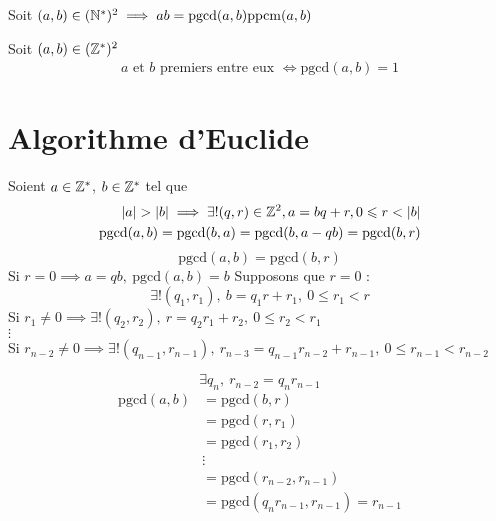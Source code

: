 \begin{graybox}
\begin{theoreme}
Soit $(a, b) \in (\mathbb{N}^*)^2 \implies ab = \mathrm{pgcd}(a, b)\mathrm{ppcm}(a, b)$
\end{theoreme}
\end{graybox}

\begin{graybox}
\begin{definition}
	Soit $(a, b) \in (\mathbb{Z}^*)^2$
	\begin{align*}
	a \text{ et } b \text{ premiers entre eux } \iff \mathrm{pgcd}(a, b) = 1
	\end{align*}
\end{definition}
\end{graybox}

\section{Algorithme d'Euclide}
\begin{graybox}
\begin{proposition}
Soient $a \in \mathbb{Z}^*$, $b \in \mathbb{Z}^*$ tel que 
\begin{align*}
|a| > |b| \implies \exists ! (q, r) \in \mathbb{Z}^2, a = b q + r, 0 \leqslant r < |b| \\
\mathrm{pgcd}(a, b) = \mathrm{pgcd}(b, a) = \mathrm{pgcd}(b, a - qb) = \mathrm{pgcd}(b, r) \\
\end{align*}
\begin{equation*}
\mathrm{pgcd}(a, b) = \mathrm{pgcd}(b, r)
\end{equation*}
Si $r = 0 \implies a = q b,\ \mathrm{pgcd}(a, b) = b$ 
Supposons que $r = 0$ :
\begin{equation*}
\exists ! (q_1, r_1),\ b = q_1 r + r_1, \ 0 \leq r_1 < r
\end{equation*}
Si $r_1 \neq 0 \implies \exists ! (q_2, r_2),\ r = q_2 r_1 + r_2,\ 0 \leq r_2 < r_1$ \\
$\vdots$ \\
Si $r_{n - 2} \neq 0 \implies \exists ! (q_{n - 1}, r_{n - 1}),\ r_{n - 3} = q_{n-1}r_{n-2} + r_{n - 1},\ 0 \leq r_{n-1} < r_{n-2}$

\begin{equation*}
\exists q_n,\ r_{n-2} = q_n r_{n-1}
\end{equation*}
\begin{align*}
\mathrm{pgcd}(a, b) &= \mathrm{pgcd}(b, r) \\
				   &= \mathrm{pgcd}(r, r_1) \\
				   &= \mathrm{pgcd}(r_1, r_2) \\
				   &\vdots \\
				   &= \mathrm{pgcd}(r_{n-2}, r_{n-1}) \\
				   &= \mathrm{pgcd}(q_n r_{n-1}, r_{n-1}) = r_{n-1}
\end{align*}
\end{proposition}
\end{graybox}

